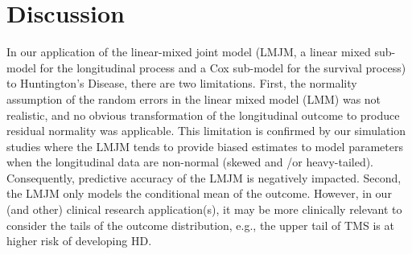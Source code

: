 \documentclass[Crown, sagev, times, doublespace]{sagej}
\begin{document}
\begin{table}[ht]
\centering
\caption{PREDICT-HD data analysis: Parameter estimation and 95\% credible interval (in parenthesis) from QRJM at three different quantiles with TMS being the longitudinal biomarker.}
\label{p1realdata_inference}
\end{table}


\section{Discussion}\label{sec:discussion}
In our application of the linear-mixed joint model (LMJM, a linear mixed sub-model for the longitudinal process and a Cox sub-model for the survival process) to Huntington's Disease, there are two limitations. First, the normality assumption of the random errors in the linear mixed model (LMM) was not realistic, and no obvious transformation of the longitudinal outcome to produce residual normality was applicable. This limitation is confirmed by our simulation studies where the LMJM tends to provide biased estimates to model parameters when the longitudinal data are non-normal (skewed and /or heavy-tailed). Consequently, predictive accuracy of the LMJM is negatively impacted. Second, the LMJM only models the conditional mean of the outcome. However, in our (and other) clinical research application(s), it may be more clinically relevant to consider the tails of the outcome distribution, e.g., the upper tail of TMS is at higher risk of developing HD.
\end{document}
